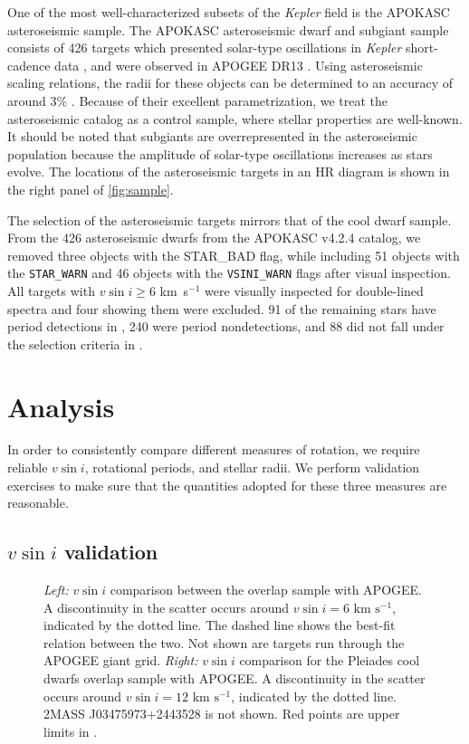 \documentclass[manuscript]{aastex6}
\newcommand{\vsini}{\ensuremath{v \sin i}}
\newcommand{\Kepler}{\mbox{\textit{Kepler}}}
\newcommand{\kms}{\textrm{ km~s}\ensuremath{^{-1}}}
\newcommand{\STARWARN}{\texttt{STAR\_WARN}}
\newcommand{\VSINIWARN}{\texttt{VSINI\_WARN}}
\begin{document}
One of the most well-characterized subsets of the \Kepler{} field is the
APOKASC asteroseismic sample. The APOKASC asteroseismic dwarf and subgiant 
sample consists of 426 targets which presented solar-type oscillations in 
\Kepler{} short-cadence data \citep{Chaplin11}, and were observed in APOGEE DR13
\citep{Majewski17}. Using asteroseismic scaling relations, the radii
for these objects can be determined to an accuracy of around 3\%
\citep{Serenelli17}. Because of their excellent parametrization, we treat the
asteroseismic catalog as a control sample, where stellar properties are
well-known. It should be noted that subgiants are overrepresented in
the asteroseismic population because the amplitude of solar-type oscillations 
increases as stars evolve. The locations of the asteroseismic targets in an HR
diagram is shown in the right panel of \cref{fig:sample}.

The selection of the asteroseismic targets mirrors that of the cool dwarf
sample. From the 426 asteroseismic dwarfs from the APOKASC v4.2.4 catalog, we 
removed three objects with the STAR\_BAD flag, while including 51 objects with 
the \STARWARN{} and 46 objects with the \VSINIWARN{} flags after visual 
inspection. All targets with \(\vsini \ge 6\) \kms{} were visually
inspected for double-lined spectra and four showing them were excluded. 91 of 
the remaining stars have period detections in \citet{McQuillan14}, 240 were 
period nondetections, and 88 did not fall under the selection criteria in 
\citet{McQuillan14}. 

\section{Analysis}
\label{sec:analysis}

In order to consistently compare different measures of rotation, we require 
reliable \vsini{}, rotational periods, and stellar radii. We perform validation
exercises to make sure that the quantities adopted for these three measures are 
reasonable.


\subsection{\vsini{} validation}
\label{sec:vsini_check}

\begin{figure}
    \caption{\emph{Left:} \vsini{} comparison between the \citet{Bruntt12}
        overlap sample with APOGEE\@. A discontinuity in the scatter occurs
        around \(\vsini = 6 \kms\), indicated by the dotted line. The dashed
    line shows the best-fit relation between the two. Not shown are targets run
    through the APOGEE giant grid. \emph{Right:} \vsini{} comparison for the
    Pleiades cool dwarfs \citep{Stauffer87} overlap sample with APOGEE\@. A
    discontinuity in the scatter occurs around \(\vsini = 12 \kms\), indicated by
    the dotted line. 2MASS J03475973+2443528 is not shown. Red points are upper
    limits in \citet{Stauffer87}.\label{fig:comps}}
\end{figure}
\end{document}
